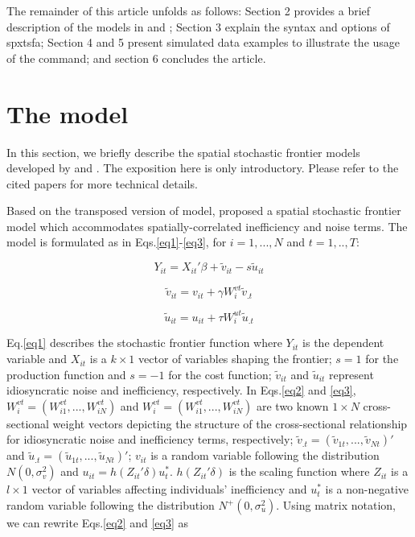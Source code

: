The remainder of this article unfolds as follows: Section 2 provides a brief description of the models in \cite{orea2019new} and \cite{galli2022spatial}; Section 3 explain the syntax and options of spxtsfa; Section 4 and 5 present simulated data examples to illustrate the usage of the command; and section 6 concludes the article.


\section{The model}\label{sec_method}
In this section, we briefly describe the spatial stochastic frontier models developed by \cite{orea2019new} and \cite{galli2022spatial}. The exposition here is only introductory. Please refer to the cited papers for more technical details.  

Based on the transposed version of \cite{wang2010estimating} model, \cite{orea2019new}  proposed a spatial stochastic frontier model which accommodates spatially-correlated inefficiency and noise terms. The model is formulated as in Eqs.\eqref{eq1}-\eqref{eq3}, for $i=1,...,N$ and $t=1,..,T$:

\begin{equation}\label{eq1}
 Y_{it} = X_{it}'\beta + \tilde{v}_{it}-s\tilde{u}_{it}
\end{equation}

\begin{equation}\label{eq2}
	\tilde{v}_{it} =v_{it}+ \gamma W_{i}^{vt}\tilde{v}_{.t} 
\end{equation}

\begin{equation}\label{eq3}
	\tilde{u}_{it} =u_{it}+ \tau W_{i}^{ut}\tilde{u}_{.t} 
\end{equation}

 Eq.\eqref{eq1}  describes the stochastic frontier function where $Y_{it}$ is the dependent variable and $X_{it}$ is a $k \times 1$ vector of variables shaping the frontier; $s=1$ for the production function and  $s=-1$ for the cost function; $\tilde{v}_{it}$ and $\tilde{u}_{it}$ represent  idiosyncratic noise and inefficiency, respectively. In  Eqs.\eqref{eq2} and \eqref{eq3}, $W_{i}^{vt}=(W_{i1}^{vt},...,W_{iN}^{vt})$ and $W_{i}^{vt}=(W_{i1}^{vt},...,W_{iN}^{vt})$ are two known $1 \times N$ cross-sectional weight vectors  depicting the structure of the  cross-sectional relationship for idiosyncratic noise and inefficiency terms, respectively; $\tilde{v}_{.t}=(\tilde{v}_{1t},...,\tilde{v}_{Nt})' $ and $\tilde{u}_{.t}=(\tilde{u}_{1t},...,\tilde{u}_{Nt})'$; $v_{it}$  is a random variable following the distribution $N(0,\sigma_v^2)$ and $u_{it}=h(Z_{it}'\delta)u_t^*$. $h(Z_{it}'\delta)$ is the scaling function where $Z_{it}$ is a $l \times 1$ vector of variables affecting individuals' inefficiency  and $u_t^*$ is a non-negative random variable following the distribution $N^+(0,\sigma_{u}^2)$.  Using matrix notation, we can rewrite Eqs.\eqref{eq2} and \eqref{eq3} as
 
